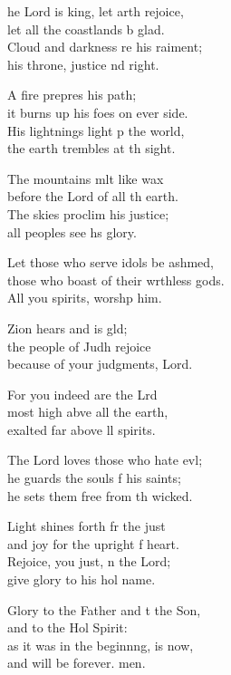 \settowidth{\versewidth}{those who boast of their worthless gods. *}
\begin{psalmverse}%
  \begin{patverse}
    he Lord is king, let arth rejoice,\Med\\
let all the coastlands b glad.\\
Cloud and darkness re his raiment;\Med\\
his throne, justice nd right.

A fire prepres his path;\Med\\
it burns up his foes on ever side.\\
His lightnings light p the world,\Med\\
the earth trembles at th sight.

The mountains mlt like wax\Med\\
before the Lord of all th earth.\\
The skies proclim his justice;\Med\\
all peoples see h\pointup{\i}s glory.

Let those who serve idols be ashmed,\Flex\\
those who boast of their wrthless gods.\Med\\
All you spirits, worsh\pointup{\i}p him.

Zion hears and is gld;\Flex\\
the people of Judh rejoice\Med\\
because of your judgments,  Lord.

For you indeed are the Lrd\Flex\\
most high abve all the earth,\Med\\
exalted far above ll spirits.

The Lord loves those who hate ev\pointup{\i}l;\Flex\\
he guards the souls f his saints;\Med\\
he sets them free from th wicked.

Light shines forth fr the just\Med\\
and joy for the upright f heart.\\
Rejoice, you just, \pointup{\i}n the Lord;\Med\\
give glory to his hol name.

Glory to the Father and t the Son,\Med\\
and to the Hol Spirit:\\
as it was in the beginn\pointup{\i}ng, is now,\Med\\
and will be forever. men.
  \end{patverse}
\end{psalmverse}
